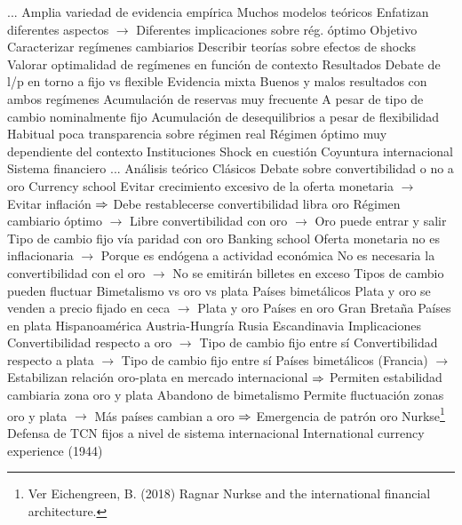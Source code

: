 \documentclass{nuevotema}
\begin{document}
\begin{esquemal}
				\4[] ...
				\4 Amplia variedad de evidencia empírica
				\4 Muchos modelos teóricos
				\4[] Enfatizan diferentes aspectos
				\4[] $\to$ Diferentes implicaciones sobre rég. óptimo
			\3 Objetivo
				\4 Caracterizar regímenes cambiarios
				\4 Describir teorías sobre efectos de shocks
				\4 Valorar optimalidad de regímenes en función de contexto
			\3 Resultados
				\4 Debate de l/p en torno a fijo vs flexible
				\4 Evidencia mixta
				\4[] Buenos y malos resultados con ambos regímenes
				\4 Acumulación de reservas muy frecuente
				\4[] A pesar de tipo de cambio nominalmente fijo
				\4 Acumulación de desequilibrios a pesar de flexibilidad
				\4 Habitual poca transparencia sobre régimen real
				\4 Régimen óptimo muy dependiente del contexto
				\4[] Instituciones
				\4[] Shock en cuestión
				\4[] Coyuntura internacional
				\4[] Sistema financiero
				\4[] ...
		\2 Análisis teórico
			\3 Clásicos
				\4 Debate sobre convertibilidad o no a oro
				\4 Currency school
				\4[] Evitar crecimiento excesivo de la oferta monetaria
				\4[] $\to$ Evitar inflación
				\4[] $\Rightarrow$ Debe restablecerse convertibilidad libra oro
				\4[] Régimen cambiario óptimo
				\4[] $\to$ Libre convertibilidad con oro
				\4[] $\to$ Oro puede entrar y salir
				\4[] Tipo de cambio fijo vía paridad con oro
				\4 Banking school
				\4[] Oferta monetaria no es inflacionaria
				\4[] $\to$ Porque es endógena a actividad económica
				\4[] No es necesaria la convertibilidad con el oro
				\4[] $\to$ No se emitirán billetes en exceso
				\4[] Tipos de cambio pueden fluctuar
			\3 Bimetalismo vs oro vs plata
				\4 Países bimetálicos
				\4[] Plata y oro se venden a precio fijado en ceca
				\4[] $\to$ Plata y oro
				\4 Países en oro
				\4[] Gran Bretaña
				\4 Países en plata
				\4[] Hispanoamérica
				\4[] Austria-Hungría
				\4[] Rusia
				\4[] Escandinavia
				\4 Implicaciones
				\4[] Convertibilidad respecto a oro
				\4[] $\to$ Tipo de cambio fijo entre sí
				\4[] Convertibilidad respecto a plata
				\4[] $\to$ Tipo de cambio fijo entre sí
				\4[] Países bimetálicos (Francia)
				\4[] $\to$ Estabilizan relación oro-plata en mercado internacional
				\4[] $\Rightarrow$ Permiten estabilidad cambiaria zona oro y plata
				\4 Abandono de bimetalismo
				\4[] Permite fluctuación zonas oro y plata
				\4[] $\to$ Más países cambian a oro
				\4[] $\Rightarrow$ Emergencia de patrón oro
			\3 Nurkse\footnote{Ver Eichengreen, B. (2018) Ragnar Nurkse and the international  financial architecture.}
				\4 Defensa de TCN fijos a nivel de sistema internacional
				\4 International currency experience (1944)

\end{esquemal}
\end{document}
